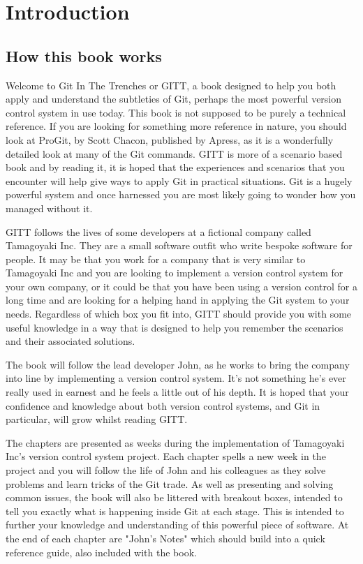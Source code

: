\cleardoublepage
\chapter{Introduction}
\section{How this book works}

Welcome to Git In The Trenches or GITT, a book designed to help you both apply and understand the subtleties of Git, perhaps the most powerful version control system in use today.
This book is not supposed to be purely a technical reference.
If you are looking for something more reference in nature, you should look at ProGit, by Scott Chacon, published by Apress, as it is a wonderfully detailed look at many of the Git commands.
GITT is more of a scenario based book and by reading it, it is hoped that the experiences and scenarios that you encounter will help give ways to apply Git in practical situations.
Git is a hugely powerful system and once harnessed you are most likely going to wonder how you managed without it.

GITT follows the lives of some developers at a fictional company called Tamagoyaki Inc.
They are a small software outfit who write bespoke software for people.
It may be that you work for a company that is very similar to Tamagoyaki Inc and you are looking to implement a version control system for your own company, or it could be that you have been using a version control for a long time and are looking for a helping hand in applying the Git system to your needs.
Regardless of which box you fit into, GITT should provide you with some useful knowledge in a way that is designed to help you remember the scenarios and their associated solutions.

The book will follow the lead developer John, as he works to bring the company into line by implementing a version control system.
It's not something he's ever really used in earnest and he feels a little out of his depth.
It is hoped that your confidence and knowledge about both version control systems, and Git in particular, will grow whilst reading GITT.

The chapters are presented as weeks during the implementation of Tamagoyaki Inc's version control system project.
Each chapter spells a new week in the project and you will follow the life of John and his colleagues as they solve problems and learn tricks of the Git trade.
As well as presenting and solving common issues, the book will also be littered with breakout boxes, intended to tell you exactly what is happening inside Git at each stage.
This is intended to further your knowledge and understanding of this powerful piece of software.
At the end of each chapter are "John's Notes" which should build into a quick reference guide, also included with the book.

